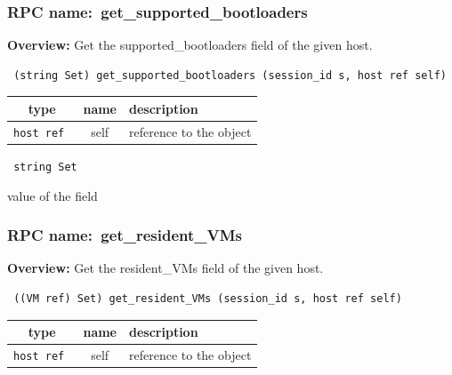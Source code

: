 \subsubsection{RPC name:~get\_supported\_bootloaders}

{\bf Overview:} 
Get the supported\_bootloaders field of the given host.

\begin{verbatim} (string Set) get_supported_bootloaders (session_id s, host ref self)\end{verbatim}



 
\vspace{0.3cm}
\begin{tabular}{|c|c|p{7cm}|}
 \hline
{\bf type} & {\bf name} & {\bf description} \\ \hline
{\tt host ref } & self & reference to the object \\ \hline 

\end{tabular}

\vspace{0.3cm}

{\tt 
string Set
}


value of the field
\vspace{0.3cm}
\vspace{0.3cm}
\vspace{0.3cm}
\subsubsection{RPC name:~get\_resident\_VMs}

{\bf Overview:} 
Get the resident\_VMs field of the given host.

\begin{verbatim} ((VM ref) Set) get_resident_VMs (session_id s, host ref self)\end{verbatim}



 
\vspace{0.3cm}
\begin{tabular}{|c|c|p{7cm}|}
 \hline
{\bf type} & {\bf name} & {\bf description} \\ \hline
{\tt host ref } & self & reference to the object \\ \hline 

\end{tabular}

